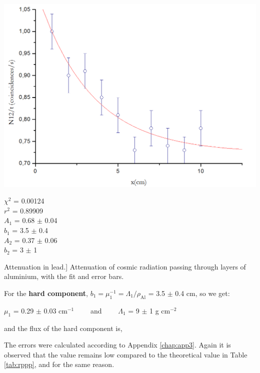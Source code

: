 	\bfi[H]
		\begin{minipage}{.78\textwidth}
			\bc\includegraphics[width=\textwidth]{img/atenuationAl.png}\ec
		\end{minipage}\begin{minipage}{.22\textwidth}
			$\chi^2$ = 0.00124\\
			$r^2$ = 0.89909\\

			$A_1$ = 0.68 $\pm$ 0.04\\
			$b_1$ = 3.5 $\pm$ 0.4\\

			$A_2$ = 0.37 $\pm$ 0.06\\
			$b_2$ = 3 $\pm$ 1\\
		\end{minipage}
		\caption
			[Attenuation in lead.]
			{Attenuation of cosmic radiation passing through layers of aluminium, with the fit and error bars.}\label{fig:alum}
	\efi


For the \textbf{hard component}, $b_1 = \mu_1^{-1} = \Lambda_1 / \rho_\text{Al}$ = 3.5 $\pm$ 0.4 cm, so we get:

\bc $\mu_1$ = 0.29 $\pm$ 0.03 cm$^{-1} \qquad$ and $\qquad \Lambda_1$ = 9 $\pm$ 1 g cm$^{-2}$\ec

and the flux of the hard component is,


The errors were calculated according to Appendix \ref{chap:app3}. Again it is observed that the value remains low compared to the theoretical value in Table \ref{tab:rppp}, and for the same reason.

